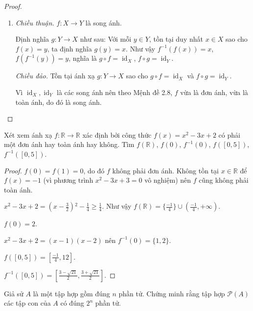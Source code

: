 \begin{proof}
\begin{enumerate}[label = (\roman*)]
        \item \textit{Chiều thuận.} $f: X\rightarrow Y$ là song ánh.

              Định nghĩa $g: Y\to X$ như sau: Với mỗi $y\in Y$, tồn tại duy nhất $x\in X$ sao cho $f(x) = y$, ta định nghĩa $g(y) = x$. Như vậy $f^{-1}(f(x)) = x$, $f(f^{-1}(y)) = y$, nghĩa là $g\circ f = \operatorname{id}_{X}$, $f\circ g = \operatorname{id}_{Y}$.

              \bigskip
              \textit{Chiều đảo.} Tồn tại ánh xạ $g: Y\rightarrow X$ sao cho $g\circ f = \operatorname{id}_{X}$ và $f\circ g = \operatorname{id}_{Y}$.

              Vì $\operatorname{id}_{X}, \operatorname{id}_{Y}$ là các song ánh nên theo Mệnh đề 2.8, $f$ vừa là đơn ánh, vừa là toàn ánh, do đó là song ánh.
    \end{enumerate}
\end{proof}

\begin{exercise}Xét xem ánh xạ $f: \mathbb{R}\rightarrow \mathbb{R}$ xác định bởi công thức $f(x) = x^{2} - 3x + 2$ có phải một đơn ánh hay toàn ánh hay không. Tìm $f(\mathbb{R})$, $f(0)$, $f^{-1}(0)$, $f([0,5])$, $f^{-1}([0,5])$.
\end{exercise}

\begin{proof}
    $f(0) = f(1) = 0$, do đó $f$ không phải đơn ánh. Không tồn tại $x\in \mathbb{R}$ để $f(x) = -1$ (vì phương trình $x^{2} - 3x + 3 = 0$ vô nghiệm) nên $f$ cũng không phải toàn ánh.
    
    $x^{2} - 3x + 2 = \left(x - \frac{3}{2}\right){}^{2} - \frac{1}{4} \ge \frac{1}{4}$. Như vậy $f(\mathbb{R}) = \{ \frac{-1}{4} \}\cup\left(\frac{-1}{4},+\infty\right)$.
    
    $f(0) = 2$.
    
    $x^{2} - 3x + 2 = (x - 1)(x - 2)$ nên $f^{-1}(0) = \{1, 2\}$.
    
    $f([0, 5]) = \left[\frac{-1}{4}, 12\right]$.
    
    $f^{-1}([0,5]) = \left[\frac{3 - \sqrt{21}}{2}, \frac{3 + \sqrt{21}}{2}\right]$.
\end{proof}

\begin{exercise}Giả sử $A$ là một tập hợp gồm đúng $n$ phần tử. Chứng minh rằng tập hợp $\mathcal{P}(A)$ các tập con của $A$ có đúng $2^{n}$ phần tử.
\end{exercise}

